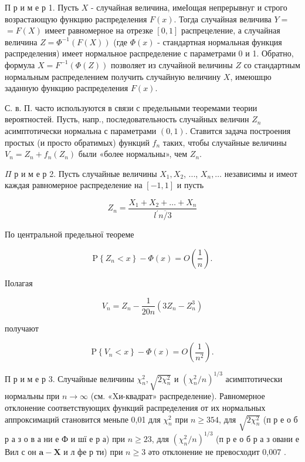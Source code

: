 \documentclass[10pt]{article}
\begin{document}
П р и м е р 1. Пусть $X$ - случайная величина, имеІощая непрерывнуг и строго возрастающую функцию распределения $F(x)$. Тогда случайная величива $Y=$ $=F(X)$ имеет равномерное на отрезке $[0,1]$ распрецеление, а случайная величина $Z=\Phi^{-1}(F(X))$ (где $\Phi(x)$ - стандартная нормальная функция распределения) имеет нормальное распределение с параметрами 0 и 1. Обратно, формула $X=F^{-1}(\Phi(Z))$ позволяет из случайной величины $Z$ со стандартным нормальным распределением получить случайную величину $X$, имеюшцю заданную функцию распределения $F(x)$.



С. в. П. часто используются в связи с предельными теоремами теории вероятностей. Пусть, напр., последовательность случайных величин $Z_{n}$ асимптотически нормальна с параметрами $(0,1)$. Ставится задача построения простых (и просто обратимых) функций $f_{n}$ таких, чтобы случайные величины $V_{n}=Z_{n}+f_{n}\left(Z_{n}\right)$ были «более нормальны», чем $Z_{n}$.



$\Pi$ р и м е р 2. Пусть случайные величины $X_{1}, X_{2}$, ..., $X_{n}, \ldots$ независимы и имеот каждая равномерное распределение на $[-1,1]$ и пусть



\[

Z_{n}=\frac{X_{1}+X_{2}+\ldots+X_{n}}{l^{\prime} \overline{n / 3}}

\]



По центральной предельної теореме



\[

\mathrm{P}\left\{Z_{n}<x\right\}-\Phi(x)=O\left(\frac{1}{n}\right) .

\]



ІІолагая



\[

V_{n}=Z_{n}-\frac{1}{20 n}\left(3 Z_{n}-Z_{n}^{3}\right)

\]



получают



\[

\mathrm{P}\left\{V_{n}<x\right\}-\Phi(x)=O\left(\frac{1}{n^{2}}\right) .

\]



П р и м е р 3. Случайные величины $\chi_{n}^{2}, \sqrt{2 \chi_{n}^{2}}$ и $\left(\chi_{n}^{2} / n\right)^{1 / 3}$ асимптотически нормальны при $n \rightarrow \infty$ (см. «Xи-квадрат» распределение). Равномерное отклонение соответствующих функций распределения от их нормальных аппроксимаций становится меньпе 0,01 для $\chi_{n}^{2}$ при $n \geqslant 354$, для $\sqrt{2 \chi_{n}^{2}}$ (п р е о б р а з о в а ни е Ф и шї е р а) при $n \geqslant 23$, для $\left(\chi_{n}^{2} / n\right)^{1 / 3}$ (п р е о б р а з овани е Вил с он $\mathbf{a}-\mathbf{X}$ и л фе р ти) при $n \geqslant 3$ әто отклонение не превосходит 0,007 .
\end{document}
